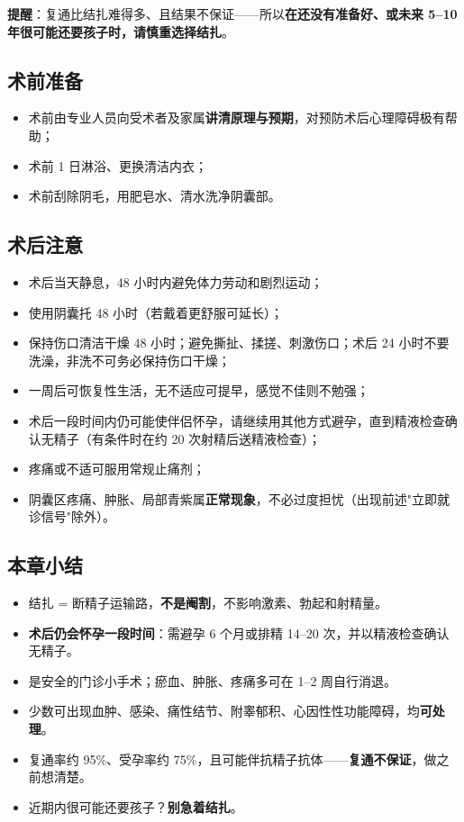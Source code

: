 \documentclass[12pt,UTF8,openany]{ctexbook}
\begin{document}
\textbf{提醒}：复通比结扎难得多、且结果不保证——所以\textbf{在还没有准备好、或未来 5–10 年很可能还要孩子时，请慎重选择结扎}。

\subsection*{术前准备}

\begin{itemize}
  \item 术前由专业人员向受术者及家属\textbf{讲清原理与预期}，对预防术后心理障碍极有帮助；
  \item 术前 1 日淋浴、更换清洁内衣；
  \item 术前刮除阴毛，用肥皂水、清水洗净阴囊部。
\end{itemize}

\subsection*{术后注意}

\begin{itemize}
  \item 术后当天静息，48 小时内避免体力劳动和剧烈运动；
  \item 使用阴囊托 48 小时（若戴着更舒服可延长）；
  \item 保持伤口清洁干燥 48 小时；避免撕扯、揉搓、刺激伤口；术后 24 小时不要洗澡，非洗不可务必保持伤口干燥；
  \item 一周后可恢复性生活，无不适应可提早，感觉不佳则不勉强；
  \item 术后一段时间内仍可能使伴侣怀孕，请继续用其他方式避孕，直到精液检查确认无精子（有条件时在约 20 次射精后送精液检查）；
  \item 疼痛或不适可服用常规止痛剂；
  \item 阴囊区疼痛、肿胀、局部青紫属\textbf{正常现象}，不必过度担忧（出现前述"立即就诊信号"除外）。
\end{itemize}

\subsection*{本章小结}

\begin{itemize}
  \item 结扎 = 断精子运输路，\textbf{不是阉割}，不影响激素、勃起和射精量。
  \item \textbf{术后仍会怀孕一段时间}：需避孕 6 个月或排精 14–20 次，并以精液检查确认无精子。
  \item 是安全的门诊小手术；瘀血、肿胀、疼痛多可在 1–2 周自行消退。
  \item 少数可出现血肿、感染、痛性结节、附睾郁积、心因性性功能障碍，均\textbf{可处理}。
  \item 复通率约 95\%、受孕率约 75\%，且可能伴抗精子抗体——\textbf{复通不保证}，做之前想清楚。
  \item 近期内很可能还要孩子？\textbf{别急着结扎}。
\end{itemize}
\end{document}
